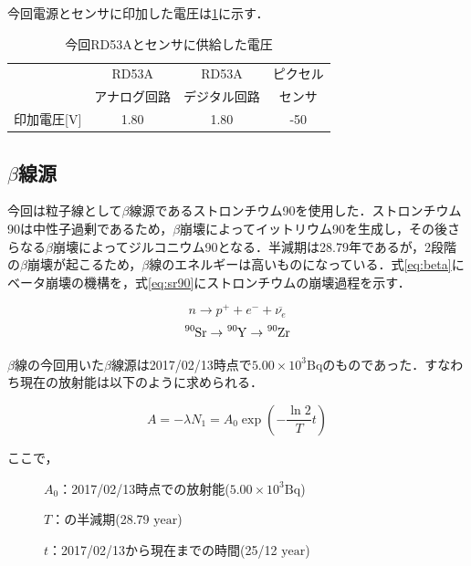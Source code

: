 今回電源とセンサに印加した電圧は\ref{tab:voltage}に示す．

\begin{table}[h]
  \centering
  \caption{今回RD53Aとセンサに供給した電圧}
  \begin{tabular} {|l|cc|c|} \hline
     & RD53A & RD53A & ピクセル \\ 
     & アナログ回路 & デジタル回路 & センサ \\ \hline
    印加電圧[$\mathrm{V}$] & 1.80 & 1.80 & -50 \\ \hline
  \end{tabular}
  \label{tab:voltage}
\end{table}


\subsection*{$\beta$線源}
今回は粒子線として$\beta$線源であるストロンチウム90を使用した．ストロンチウム90は中性子過剰であるため，$\beta$崩壊によってイットリウム90を生成し，その後さらなる$\beta$崩壊によってジルコニウム90となる．半減期は28.79年であるが，2段階の$\beta$崩壊が起こるため，$\beta$線のエネルギーは高いものになっている．式\ref{eq:beta}にベータ崩壊の機構を，式\ref{eq:sr90}にストロンチウムの崩壊過程を示す．\par
\begin{equation}
  \label{eq:beta}
  n \rightarrow p^{+} + e^{-} + \overline{\nu_e}
\end{equation}
\begin{equation}
  \label{eq:sr90}
  \ce{^{90}Sr} \rightarrow \ce{^{90}Y} \rightarrow \ce{^{90}Zr}
\end{equation}


$\beta$線の今回用いた$\beta$線源は2017/02/13時点で$ 5.00 \times 10^3 \mathrm{Bq}$のものであった．すなわち現在の放射能は以下のように求められる．

\begin{equation}
\label{eq:radiation}
  A = -\lambda N_1 = A_0 \exp \left( - \frac{\ln 2}{T} t \right)
\end{equation}

ここで，
\begin{description}
\item[] $A_0$：2017/02/13時点での放射能($ 5.00 \times 10^3 \mathrm{Bq}$)
\item[] $T$：の半減期(28.79 $\mathrm{year}$)
\item[] $t$：2017/02/13から現在までの時間(25/12 $\mathrm{year}$)
\end{description}

